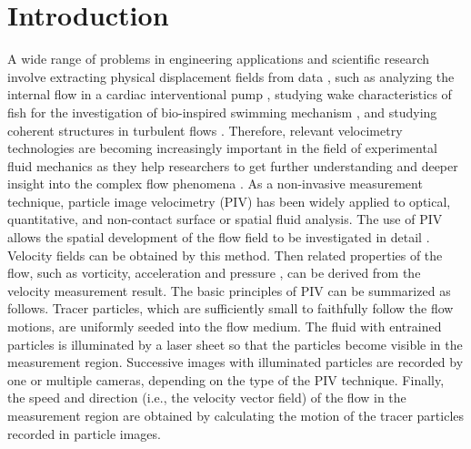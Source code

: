 \documentclass[%
 aip,
 amsmath,amssymb,
 reprint,%
]{revtex4-1}
\begin{document}
\section{Introduction}
\label{sect1}
% 
% 
% 
% 

A wide range of problems in engineering applications and scientific research involve extracting physical displacement fields from data \citep{Adrian1991,LiAI2008,Juan2009,Taylor2011},
such as analyzing the internal flow in a cardiac interventional pump \citep{triep2006,triep2008}, studying wake characteristics of fish for the investigation of bio-inspired swimming mechanism \citep{Tytell2008,Ting2009,Flammang2011,Shen2012}, and studying coherent structures in turbulent flows \citep{wang2019experimental,Wang2021}.
Therefore, relevant velocimetry technologies are becoming increasingly important in the field of experimental fluid mechanics as they help researchers to get further understanding and deeper insight into the complex flow phenomena \citep{cai2019}.
As a non-invasive measurement technique, particle image velocimetry (PIV)\citep{Raffel2007,Adrian2011} has been widely applied to optical, quantitative, and non-contact surface or spatial fluid analysis.
The use of PIV allows the spatial development of the flow field to be investigated in detail \citep{Pratt2013}.
Velocity fields can be obtained by this method. Then related properties of the flow, such as vorticity, acceleration \citep{IPTA} and pressure \citep{irro-pre,PCS}, can be derived from the velocity measurement result.
The basic principles of PIV can be summarized as follows. 
Tracer particles, which are sufficiently small to faithfully follow the flow motions, are uniformly seeded into the flow medium. 
The fluid with entrained particles is illuminated by a laser sheet so that the particles become visible in the measurement region.
Successive images with illuminated particles are recorded by one or multiple cameras, depending on the type of the PIV technique.
Finally, the speed and direction (i.e., the velocity vector field) of the flow in the measurement region are obtained by calculating the motion of the tracer particles recorded in particle images.
\end{document}
